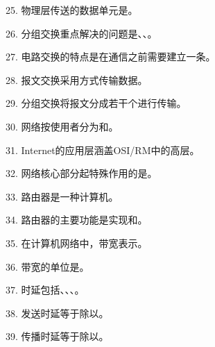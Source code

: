 25. 物理层传送的数据单元是\underline{\hspace{2cm}}。

26. 分组交换重点解决的问题是\underline{\hspace{2cm}}、\underline{\hspace{2cm}}、\underline{\hspace{2cm}}。

27. 电路交换的特点是在通信之前需要建立一条\underline{\hspace{2cm}}。

28. 报文交换采用\underline{\hspace{2cm}}方式传输数据。

29. 分组交换将报文分成若干个\underline{\hspace{2cm}}进行传输。

30. 网络按使用者分为\underline{\hspace{2cm}}和\underline{\hspace{2cm}}。

31. Internet的应用层涵盖OSI/RM中的高\underline{\hspace{2cm}}层。

32. 网络核心部分起特殊作用的是\underline{\hspace{2cm}}。

33. 路由器是一种\underline{\hspace{2cm}}计算机。

34. 路由器的主要功能是实现\underline{\hspace{2cm}}和\underline{\hspace{2cm}}。

35. 在计算机网络中，带宽表示\underline{\hspace{4cm}}。

36. 带宽的单位是\underline{\hspace{2cm}}。

37. 时延包括\underline{\hspace{2cm}}、\underline{\hspace{2cm}}、\underline{\hspace{2cm}}、\underline{\hspace{2cm}}。

38. 发送时延等于\underline{\hspace{2cm}}除以\underline{\hspace{2cm}}。

39. 传播时延等于\underline{\hspace{2cm}}除以\underline{\hspace{2cm}}。

